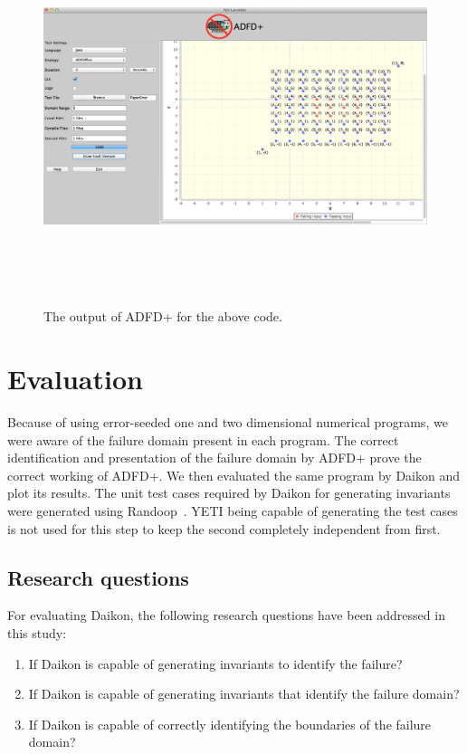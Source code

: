 \begin{figure}[ht]
\centering
\includegraphics[width=17.5cm,height=11cm]{exampleError.png}
\caption{The output of ADFD+ for the above code.}
\label{fig:adfdPlusExample}
\end{figure}











\section{Evaluation}\label{sec:eval}
Because of using error-seeded one and two dimensional numerical programs, we were aware of the failure domain present in each program. The correct identification and presentation of the failure domain by ADFD+ prove the correct working of ADFD+. We then evaluated the same program by Daikon and plot its results. The unit test cases required by Daikon for generating invariants were generated using Randoop~\cite{}. YETI being capable of generating the test cases is not used for this step to keep the second completely independent from first. 

\subsection{Research questions}
For evaluating Daikon, the following research questions have been addressed in this study:
\begin{enumerate}
\item If Daikon is capable of generating invariants to identify the failure?
\item If Daikon is capable of generating invariants that identify the failure domain?
\item If Daikon is capable of correctly identifying the boundaries of the failure domain?
\end{enumerate}

